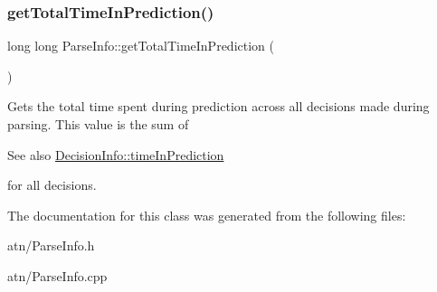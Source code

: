 \subsubsection{\texorpdfstring{get\+Total\+Time\+In\+Prediction()}{getTotalTimeInPrediction()}}
{\footnotesize\ttfamily long long Parse\+Info\+::get\+Total\+Time\+In\+Prediction (\begin{DoxyParamCaption}{ }\end{DoxyParamCaption})\hspace{0.3cm}{\ttfamily [virtual]}}



Gets the total time spent during prediction across all decisions made during parsing. This value is the sum of \begin{DoxySeeAlso}{See also}
\hyperlink{classantlr4_1_1atn_1_1DecisionInfo_ae758fc847ab20067a1136393a0ae49c3}{Decision\+Info\+::time\+In\+Prediction}


\end{DoxySeeAlso}
for all decisions. 



The documentation for this class was generated from the following files\+:\begin{DoxyCompactItemize}
\item 
atn/Parse\+Info.\+h\item 
atn/Parse\+Info.\+cpp\end{DoxyCompactItemize}
